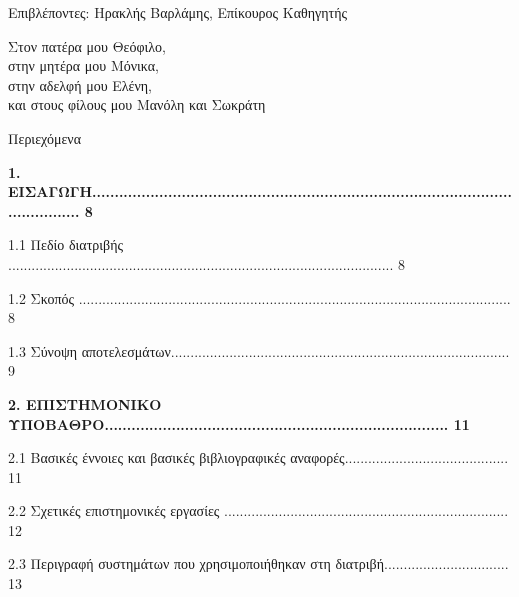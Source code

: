 \documentclass{report}
\begin{document}
\vspace{20mm}

\begin{center}
Επιβλέποντες:  Ηρακλής Βαρλάμης, Επίκουρος Καθηγητής 
\end{center}
\newpage



\begin{center}
Στον πατέρα μου Θεόφιλο, \\
στην μητέρα μου Μόνικα, \\
στην αδελφή μου Ελένη, \\
και στους φίλους μου Μανόλη και Σωκράτη
\end{center}

\newpage
\begin{center}
\huge{Περιεχόμενα}
\end{center}


\vspace{16mm}


    \vspace{10mm}


\begin{list}
\textbf{1. ΕΙΣΑΓΩΓΗ.............................................................................................................. 8 }
   \vspace{2mm} 
    \item{1.1 Πεδίο διατριβής ................................................................................................... 8 }
    \item{1.2 Σκοπός ............................................................................................................... 8 }
    \item{1.3 Σύνοψη αποτελεσμάτων....................................................................................... 9}
    \vspace{5mm}
\end{list}


\begin{list}
\textbf{2. ΕΠΙΣΤΗΜΟΝΙΚΟ ΥΠΟΒΑΘΡΟ............................................................................. 11}
   \vspace{2mm} 
    \item{2.1 Βασικές έννοιες και βασικές βιβλιογραφικές αναφορές.......................................... 11}
    \item{2.2 Σχετικές επιστημονικές εργασίες ......................................................................... 12}
    \item{2.3 Περιγραφή συστημάτων που χρησιμοποιήθηκαν στη διατριβή................................ 13}
    \vspace{5mm}
\end{list}
\end{document}
